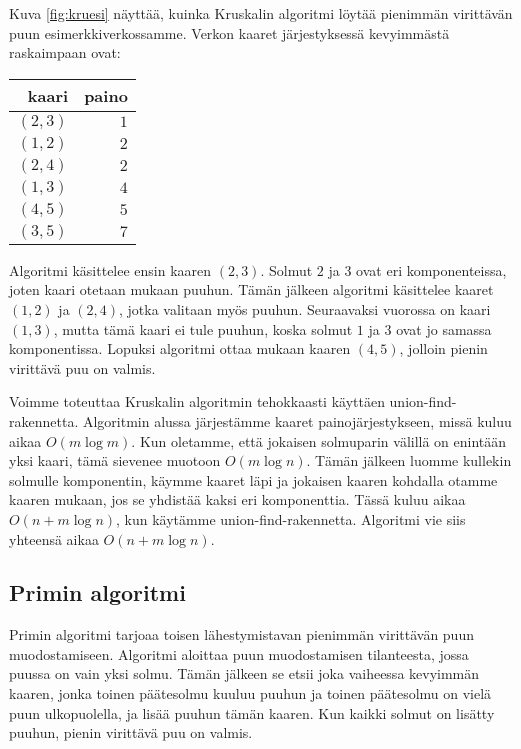 Kuva \ref{fig:kruesi} näyttää, kuinka Kruskalin algoritmi löytää pienimmän virittävän
puun esimerkkiverkossamme.
Verkon kaaret järjestyksessä kevyim\-mästä raskaimpaan ovat:

\begin{center}
\begin{tabular}{rr}
kaari & paino \\
\hline
$(2,3)$ & $1$ \\
$(1,2)$ & $2$ \\
$(2,4)$ & $2$ \\
$(1,3)$ & $4$ \\
$(4,5)$ & $5$ \\
$(3,5)$ & $7$ \\
\end{tabular}
\end{center}

Algoritmi käsittelee ensin kaaren $(2,3)$.
Solmut $2$ ja $3$ ovat eri komponenteissa,
joten kaari otetaan mukaan puuhun.
Tämän jälkeen algoritmi käsittelee kaaret $(1,2)$ ja $(2,4)$,
jotka valitaan myös puuhun.
Seuraavaksi vuorossa on kaari $(1,3)$,
mutta tämä kaari ei tule puuhun,
koska solmut $1$ ja $3$ ovat jo samassa komponentissa.
Lopuksi algoritmi ottaa mukaan kaaren $(4,5)$,
jolloin pienin virittävä puu on valmis.

Voimme toteuttaa Kruskalin algoritmin tehokkaasti
käyttäen union-find-rakennetta.
Algoritmin alussa järjestämme kaaret painojärjestykseen,
missä kuluu aikaa $O(m \log m)$.
Kun oletamme, että jokaisen solmuparin välillä
on enintään yksi kaari, tämä sievenee muotoon $O(m \log n)$.
Tämän jälkeen luomme kullekin solmulle komponentin,
käymme kaaret läpi ja jokaisen kaaren
kohdalla otamme kaaren mukaan, jos se yhdistää kaksi eri komponenttia.
Tässä kuluu aikaa $O(n+m \log n)$,
kun käytämme union-find-rakennetta.
Algoritmi vie siis yhteensä aikaa $O(n+m \log n)$.

\subsection{Primin algoritmi}


Primin algoritmi tarjoaa toisen lähestymistavan
pienimmän virittävän puun muodostamiseen.
Algoritmi aloittaa puun muodostamisen tilanteesta,
jossa puussa on vain yksi solmu.
Tämän jälkeen se etsii joka vaiheessa kevyimmän kaaren,
jonka toinen päätesolmu kuuluu puuhun ja toinen
päätesolmu on vielä puun ulkopuolella, ja lisää puuhun tämän kaaren.
Kun kaikki solmut on lisätty puuhun, pienin virittävä puu on valmis.

